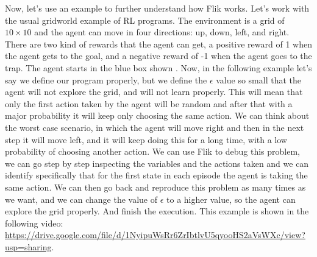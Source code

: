 Now, let's use an example to further understand how \ac{Flik} works. Let's work with 
the usual gridworld example of \ac{RL} programs. The environment is a grid of 
$10 \times 10$ and the agent can move in four directions: up, down, left, and right.
There are two kind of rewards that the agent can get, a positive reward of 1 when 
the agent gets to the goal, and a negative reward of -1 when the agent goes to the 
trap. The agent starts in the blue box shown . Now, in the following
example let's say we define our program properly, but we define the $\epsilon$ value 
so small that the agent will not explore the grid, and will not learn properly. 
This will mean that only the first action taken by the agent will be random and after that
with a major probability it will keep only choosing the same action. We can think about 
the worst case scenario, in which the agent will move right and then in the next step it 
will move left, and it will keep doing this for a long time, with a low probability of 
choosing another action. We can use \ac{Flik} to debug this problem, we can go step by step
inspecting the variables and the actions taken and we can identify specifically that for 
the first state in each episode the agent is taking the same action. We can then go back and
reproduce this problem as many times as we want, and we can change the value of $\epsilon$
to a higher value, so the agent can explore the grid properly. And finish the execution.
This example is shown in the following video: \url{https://drive.google.com/file/d/1NyipuWsRr6ZrIbtlvU5qyooHS2aVsWXc/view?usp=sharing}.



\endinput

